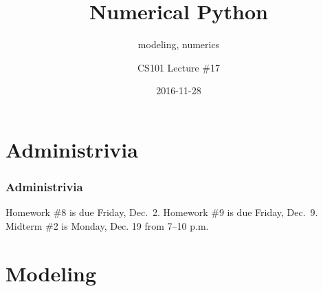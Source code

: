 \documentclass[11pt]{beamer}
\title{Numerical Python}
\subtitle{modeling, numerics}
\author{CS101 Lecture \#17}
\date{2016-11-28}
\begin{document}
  \setcounter{showProgressBar}{0}
  \setcounter{showSlideNumbers}{0}

\frame{\titlepage}

\setcounter{framenumber}{0}
\setcounter{showProgressBar}{1}
\setcounter{showSlideNumbers}{1}

\section{Administrivia}

\begin{frame}
  \frametitle{Administrivia}
  \Enlarge

  \begin{itemize}
  \myitem  Homework \#8 is due Friday, Dec.\ 2.
  \myitem  Homework \#9 is due Friday, Dec.\ 9.
  \myitem  Midterm \#2 is Monday, Dec. 19 from 7–10 p.m.
  \end{itemize}
\end{frame}

\section{Modeling}
\end{document}
